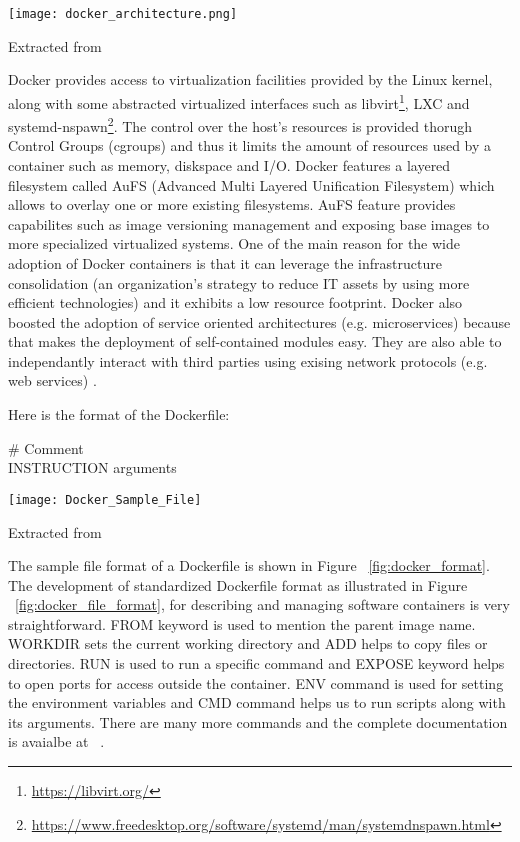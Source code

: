 \begin{center}
\texttt{[image: docker\_architecture.png]}
\label{fig:docker_architecture}
\caption*{Extracted from \cite{docker-documentation}}
\end{center}


Docker provides access to virtualization facilities provided by the Linux kernel, along with some abstracted virtualized interfaces such as libvirt\footnote{\url{https://libvirt.org/}}, LXC and systemd-nspawn\footnote{\url{https://www.freedesktop.org/software/systemd/man/systemdnspawn.html}}. The control over the host's resources is provided thorugh Control Groups (cgroups) and thus it limits the amount of resources used by a container such as memory, diskspace and I/O. Docker features a layered filesystem called AuFS (Advanced Multi Layered Unification Filesystem) which allows to overlay one or more existing filesystems. AuFS feature provides capabilites such as image versioning management and exposing base images to more specialized virtualized systems. One of the main reason for the wide adoption of Docker containers is that it can leverage the infrastructure consolidation (an organization's strategy to reduce IT assets by using more efficient technologies) and it exhibits a low resource footprint. Docker also boosted the adoption of service oriented architectures (e.g. microservices) because that makes the deployment of self-contained modules easy. They are also able to independantly interact with third parties using exising network protocols (e.g. web services) \cite{Xavier:2013:PEC:2497369.2497577}. 

Here is the format of the Dockerfile:

\begin{tcolorbox}[colback=black!5!white,colframe=black!75!black]
\# Comment \\
INSTRUCTION arguments
\end{tcolorbox}
\label{fig:docker_format}

\begin{center}
\texttt{[image: Docker\_Sample\_File]}
\label{fig:docker_file_format}
\caption*{Extracted from \cite{docker-file-format}}
\end{center}

The sample file format of a Dockerfile is shown in Figure ~\ref{fig:docker_format}. The development of standardized Dockerfile format as illustrated in Figure ~\ref{fig:docker_file_format}, for describing and managing software containers is very straightforward. FROM keyword is used to mention the parent image name. WORKDIR sets the current working directory and ADD helps to copy files or directories. RUN is used to run a specific command and EXPOSE keyword helps to open ports for access outside the container. ENV command is used for setting the environment variables and CMD command helps us to run scripts along with its arguments. There are many more commands and the complete documentation is avaialbe at ~\cite{docker_commands}.

